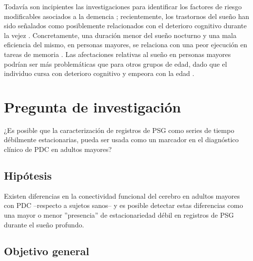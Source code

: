 \documentclass[12pt,a4paper]{mitthesis}
\begin{document}
Todav\'ia son incipientes las investigaciones para identificar los factores de riesgo 
modificables asociados a la demencia \cite{PlanAlzheimer04}; recientemente, los trastornos del 
sue\~no han sido se\~nalados como posiblemente relacionados con el deterioro cognitivo durante la 
vejez \cite{Amer13,Miyata13,Potvin12}. Concretamente, una duraci\'on menor del sue\~no nocturno y 
una mala eficiencia del mismo, en personas mayores, se relaciona con una peor ejecuci\'on en tareas 
de memoria \cite{Reid06}. Las afectaciones relativas al sue\~no en personas mayores podr\'ian ser 
m\'as problem\'aticas que para otros grupos de edad, dado que el individuo cursa con deterioro 
cognitivo y empeora con la edad \cite{Potvin12}.


\section{Pregunta de investigaci\'on}

¿Es posible que la caracterizaci\'on de registros de PSG como series de tiempo d\'ebilmente 
estacionarias, pueda ser usada como un marcador en el diagn\'ostico cl\'inico de PDC en adultos 
mayores?



\subsection{Hip\'otesis}

Existen diferencias en la conectividad funcional del cerebro en adultos mayores con PDC --respecto
a sujetos sanos-- y es posible detectar estas diferencias como una mayor o menor ''presencia'' de 
estacionariedad d\'ebil en registros de PSG durante el sue\~no profundo.


\subsection{Objetivo general}
\end{document}
